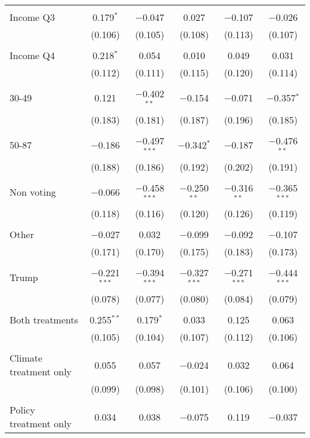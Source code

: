 \begin{tabular}{@{\extracolsep{5pt}}lccccc}
  & & & & & \\ 
 Income Q3 & 0.179$^{*}$ & $-$0.047 & 0.027 & $-$0.107 & $-$0.026 \\ 
  & (0.106) & (0.105) & (0.108) & (0.113) & (0.107) \\ 
  & & & & & \\ 
 Income Q4 & 0.218$^{*}$ & 0.054 & 0.010 & 0.049 & 0.031 \\ 
  & (0.112) & (0.111) & (0.115) & (0.120) & (0.114) \\ 
  & & & & & \\ 
 30-49 & 0.121 & $-$0.402$^{**}$ & $-$0.154 & $-$0.071 & $-$0.357$^{*}$ \\ 
  & (0.183) & (0.181) & (0.187) & (0.196) & (0.185) \\ 
  & & & & & \\ 
 50-87 & $-$0.186 & $-$0.497$^{***}$ & $-$0.342$^{*}$ & $-$0.187 & $-$0.476$^{**}$ \\ 
  & (0.188) & (0.186) & (0.192) & (0.202) & (0.191) \\ 
  & & & & & \\ 
 Non voting & $-$0.066 & $-$0.458$^{***}$ & $-$0.250$^{**}$ & $-$0.316$^{**}$ & $-$0.365$^{***}$ \\ 
  & (0.118) & (0.116) & (0.120) & (0.126) & (0.119) \\ 
  & & & & & \\ 
 Other & $-$0.027 & 0.032 & $-$0.099 & $-$0.092 & $-$0.107 \\ 
  & (0.171) & (0.170) & (0.175) & (0.183) & (0.173) \\ 
  & & & & & \\ 
 Trump & $-$0.221$^{***}$ & $-$0.394$^{***}$ & $-$0.327$^{***}$ & $-$0.271$^{***}$ & $-$0.444$^{***}$ \\ 
  & (0.078) & (0.077) & (0.080) & (0.084) & (0.079) \\ 
  & & & & & \\ 
 Both treatments & 0.255$^{**}$ & 0.179$^{*}$ & 0.033 & 0.125 & 0.063 \\ 
  & (0.105) & (0.104) & (0.107) & (0.112) & (0.106) \\ 
  & & & & & \\ 
 Climate treatment only & 0.055 & 0.057 & $-$0.024 & 0.032 & 0.064 \\ 
  & (0.099) & (0.098) & (0.101) & (0.106) & (0.100) \\ 
  & & & & & \\ 
 Policy treatment only & 0.034 & 0.038 & $-$0.075 & 0.119 & $-$0.037 \\ 

\end{tabular}
